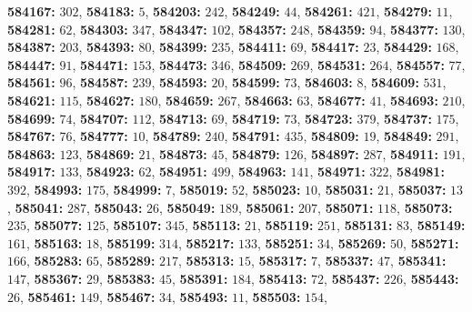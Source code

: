 \textsf{\bfseries 584167:} $302$, \textsf{\bfseries 584183:} $5$, \textsf{\bfseries 584203:} $242$, \textsf{\bfseries 584249:} $44$, \textsf{\bfseries 584261:} $421$, \textsf{\bfseries 584279:} $11$, \textsf{\bfseries 584281:} $62$, \textsf{\bfseries 584303:} $347$, \textsf{\bfseries 584347:} $102$, \textsf{\bfseries 584357:} $248$, \textsf{\bfseries 584359:} $94$, \textsf{\bfseries 584377:} $130$, \textsf{\bfseries 584387:} $203$, \textsf{\bfseries 584393:} $80$, \textsf{\bfseries 584399:} $235$, \textsf{\bfseries 584411:} $69$, \textsf{\bfseries 584417:} $23$, \textsf{\bfseries 584429:} $168$, \textsf{\bfseries 584447:} $91$, \textsf{\bfseries 584471:} $153$, \textsf{\bfseries 584473:} $346$, \textsf{\bfseries 584509:} $269$, \textsf{\bfseries 584531:} $264$, \textsf{\bfseries 584557:} $77$, \textsf{\bfseries 584561:} $96$, \textsf{\bfseries 584587:} $239$, \textsf{\bfseries 584593:} $20$, \textsf{\bfseries 584599:} $73$, \textsf{\bfseries 584603:} $8$, \textsf{\bfseries 584609:} $531$, \textsf{\bfseries 584621:} $115$, \textsf{\bfseries 584627:} $180$, \textsf{\bfseries 584659:} $267$, \textsf{\bfseries 584663:} $63$, \textsf{\bfseries 584677:} $41$, \textsf{\bfseries 584693:} $210$, \textsf{\bfseries 584699:} $74$, \textsf{\bfseries 584707:} $112$, \textsf{\bfseries 584713:} $69$, \textsf{\bfseries 584719:} $73$, \textsf{\bfseries 584723:} $379$, \textsf{\bfseries 584737:} $175$, \textsf{\bfseries 584767:} $76$, \textsf{\bfseries 584777:} $10$, \textsf{\bfseries 584789:} $240$, \textsf{\bfseries 584791:} $435$, \textsf{\bfseries 584809:} $19$, \textsf{\bfseries 584849:} $291$, \textsf{\bfseries 584863:} $123$, \textsf{\bfseries 584869:} $21$, \textsf{\bfseries 584873:} $45$, \textsf{\bfseries 584879:} $126$, \textsf{\bfseries 584897:} $287$, \textsf{\bfseries 584911:} $191$, \textsf{\bfseries 584917:} $133$, \textsf{\bfseries 584923:} $62$, \textsf{\bfseries 584951:} $499$, \textsf{\bfseries 584963:} $141$, \textsf{\bfseries 584971:} $322$, \textsf{\bfseries 584981:} $392$, \textsf{\bfseries 584993:} $175$, \textsf{\bfseries 584999:} $7$, \textsf{\bfseries 585019:} $52$, \textsf{\bfseries 585023:} $10$, \textsf{\bfseries 585031:} $21$, \textsf{\bfseries 585037:} $13$, \textsf{\bfseries 585041:} $287$, \textsf{\bfseries 585043:} $26$, \textsf{\bfseries 585049:} $189$, \textsf{\bfseries 585061:} $207$, \textsf{\bfseries 585071:} $118$, \textsf{\bfseries 585073:} $235$, \textsf{\bfseries 585077:} $125$, \textsf{\bfseries 585107:} $345$, \textsf{\bfseries 585113:} $21$, \textsf{\bfseries 585119:} $251$, \textsf{\bfseries 585131:} $83$, \textsf{\bfseries 585149:} $161$, \textsf{\bfseries 585163:} $18$, \textsf{\bfseries 585199:} $314$, \textsf{\bfseries 585217:} $133$, \textsf{\bfseries 585251:} $34$, \textsf{\bfseries 585269:} $50$, \textsf{\bfseries 585271:} $166$, \textsf{\bfseries 585283:} $65$, \textsf{\bfseries 585289:} $217$, \textsf{\bfseries 585313:} $15$, \textsf{\bfseries 585317:} $7$, \textsf{\bfseries 585337:} $47$, \textsf{\bfseries 585341:} $147$, \textsf{\bfseries 585367:} $29$, \textsf{\bfseries 585383:} $45$, \textsf{\bfseries 585391:} $184$, \textsf{\bfseries 585413:} $72$, \textsf{\bfseries 585437:} $226$, \textsf{\bfseries 585443:} $26$, \textsf{\bfseries 585461:} $149$, \textsf{\bfseries 585467:} $34$, \textsf{\bfseries 585493:} $11$, \textsf{\bfseries 585503:} $154$, 
